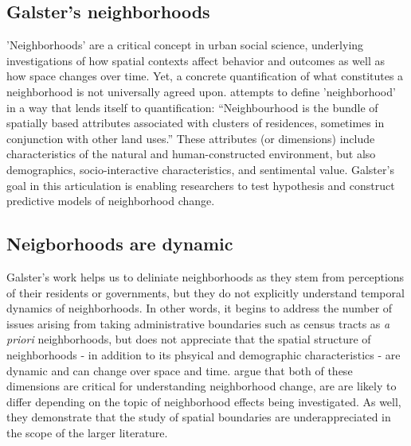 \subsection{Galster's neighborhoods}
'Neighborhoods' are a critical concept in urban social science,
underlying investigations of how spatial contexts affect behavior and
outcomes as well as how space changes over time. Yet, a concrete
quantification of what constitutes a neighborhood is not universally
agreed upon. \cite{galster2001NatureNeighbourhood} attempts to define
'neighborhood' in a way that lends itself to quantification:
``Neighbourhood is the bundle of spatially based attributes associated
with clusters of residences, sometimes in conjunction with other land
uses.'' These attributes (or dimensions) include characteristics of
the natural and human-constructed environment, but also demographics,
socio-interactive characteristics, and sentimental value. Galster's
goal in this articulation is enabling researchers to test hypothesis
and construct predictive models of neighborhood change.

\subsection{Neigborhoods are dynamic}
Galster's work helps us to deliniate neighborhoods as they stem from
perceptions of their residents or governments, but they do not
explicitly understand temporal dynamics of neighborhoods. In other
words, it begins to address the number of issues arising from taking
administrative boundaries such as census tracts as \emph{a priori}
neighborhoods, but does not appreciate that the spatial structure of
neighborhoods - in addition to its phsyical and demographic
characteristics - are dynamic and can change over space and
time. \cite{rey2011MeasuringSpatial} argue that both of these
dimensions are critical for understanding neighborhood change, are are
likely to differ depending on the topic of neighborhood effects being
investigated. As well, they demonstrate that the study of spatial
boundaries are underappreciated in the scope of the larger literature.

